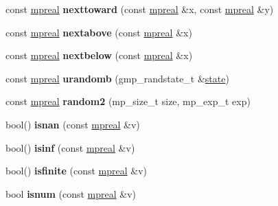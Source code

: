 \begin{DoxyCompactItemize}
const \hyperlink{classmpfr_1_1mpreal}{mpreal} {\bfseries nexttoward} (const \hyperlink{classmpfr_1_1mpreal}{mpreal} \&x, const \hyperlink{classmpfr_1_1mpreal}{mpreal} \&y)
\item 
\mbox{\label{classmpfr_1_1mpreal_a72974801eb3bba855566a29af1934206}} 
const \hyperlink{classmpfr_1_1mpreal}{mpreal} {\bfseries nextabove} (const \hyperlink{classmpfr_1_1mpreal}{mpreal} \&x)
\item 
\mbox{\label{classmpfr_1_1mpreal_a1202bca3385ba82b0dde615a544c08c9}} 
const \hyperlink{classmpfr_1_1mpreal}{mpreal} {\bfseries nextbelow} (const \hyperlink{classmpfr_1_1mpreal}{mpreal} \&x)
\item 
\mbox{\label{classmpfr_1_1mpreal_a5e5b1ebdd384d6d4e8804daca7c64cb5}} 
const \hyperlink{classmpfr_1_1mpreal}{mpreal} {\bfseries urandomb} (gmp\+\_\+randstate\+\_\+t \&\hyperlink{structstate}{state})
\item 
\mbox{\label{classmpfr_1_1mpreal_af7d51c2394ee29d49701d21d18807f63}} 
const \hyperlink{classmpfr_1_1mpreal}{mpreal} {\bfseries random2} (mp\+\_\+size\+\_\+t size, mp\+\_\+exp\+\_\+t exp)
\item 
\mbox{\label{classmpfr_1_1mpreal_ae5a94d2e143c07951b7240ac95390df7}} 
bool() {\bfseries isnan} (const \hyperlink{classmpfr_1_1mpreal}{mpreal} \&v)
\item 
\mbox{\label{classmpfr_1_1mpreal_a7699954862f6fb59ee3905d124694608}} 
bool() {\bfseries isinf} (const \hyperlink{classmpfr_1_1mpreal}{mpreal} \&v)
\item 
\mbox{\label{classmpfr_1_1mpreal_a70a81c885e2fefe53c850d82989925f2}} 
bool() {\bfseries isfinite} (const \hyperlink{classmpfr_1_1mpreal}{mpreal} \&v)
\item 
\mbox{\label{classmpfr_1_1mpreal_aecd109d7efc9f5fbcdd6ff180a9361fd}} 
bool {\bfseries isnum} (const \hyperlink{classmpfr_1_1mpreal}{mpreal} \&v)
\item 
\mbox{\label{classmpfr_1_1mpreal_aced5c3fe849c0f4f4717f1f4b4217932}} 

\end{DoxyCompactItemize}

